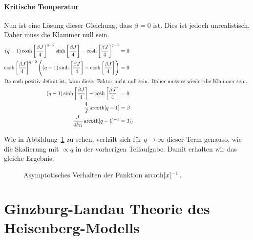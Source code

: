 \paragraph{Kritische Temperatur}

Nun ist eine Lösung dieser Gleichung, dass $\beta = 0$ ist. Dies ist jedoch
unrealistisch. Daher muss die Klammer null sein.
\begin{align*}
    (q-1) \cosh\sbr{\frac{\beta J}4}^{q-2}
    \sinh\sbr{\frac{\beta J}4}
    - \cosh\sbr{\frac{\beta J}4}^{q-1} &= 0 \\
    \cosh\sbr{\frac{\beta J}4}^{q-2}
    \del{
        (q-1) \sinh\sbr{\frac{\beta J}4}
        - \cosh\sbr{\frac{\beta J}4}
    } &= 0 \\
    \intertext{%
        Da $\cosh$ positiv definit ist, kann dieser Faktor nicht null sein.
        Daher muss es wieder die Klammer sein.
    }
    (q-1) \sinh\sbr{\frac{\beta J}4}
    - \cosh\sbr{\frac{\beta J}4} &= 0 \\
    \frac 4J \arcoth[q-1] &= \beta \\
    \frac{J}{4 \kB} \arcoth[q-1]^{-1} &= T_\text C
\end{align*}

Wie in Abbildung~\ref{fig:arcoth} zu sehen, verhält sich für $q\to\infty$
dieser Term genauso, wie die Skalierung mit $\propto q$ in der vorherigen
Teilaufgabe. Damit erhalten wir das gleiche Ergebnis.

\begin{figure}[htbp]
    \centering
    \caption{%
        Asymptotisches Verhalten der Funktion $\operatorname{arcoth}[x]^{-1}$.
    }
    \label{fig:arcoth}
\end{figure}


\section{Ginzburg-Landau Theorie des Heisenberg-Modells}

\fehlt

\IfFileExists{\bibliographyfile}{
    \printbibliography
}{}




